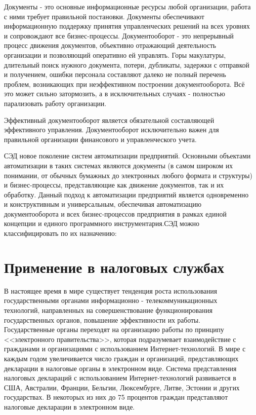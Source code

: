 \documentclass[14pt,a4paper]{reportmod}
\begin{document}
Документы - это основные информационные ресурсы любой организации, работа с ними требует правильной постановки. Документы обеспечивают информационную поддержку принятия управленческих решений на всех уровнях и сопровождают все бизнес-процессы. Документооборот - это непрерывный процесс движения документов, объективно отражающий деятельность организации и позволяющий оперативно ей управлять. Горы макулатуры, длительный поиск нужного документа, потери, дубликаты, задержки с отправкой и получением, ошибки персонала составляют далеко не полный перечень проблем, возникающих при неэффективном построении документооборота. Всё это может сильно затормозить, а в исключительных случаях - полностью парализовать работу организации\cite{refdoconline}.


Эффективный документооборот является обязательной составляющей эффективного управления. Документооборот исключительно важен для правильной организации финансового и управленческого учета.


СЭД новое поколение систем автоматизации предприятий. Основными объектами автоматизации в таких системах являются документы (в самом широком их понимании, от обычных бумажных до электронных любого формата и структуры) и бизнес-процессы, представляющие как движение документов, так и их обработку. Данный подход к автоматизации предприятий является одновременно и конструктивным и универсальным, обеспечивая автоматизацию документооборота и всех бизнес-процессов предприятия в рамках единой концепции и единого программного инструментария.СЭД можно классифицировать по их назначению:
\begin{gostitemize}
\end{gostitemize}

\section{Применение в налоговых службах}
В настоящее время в мире существует тенденция роста использования государственными органами информационно - телекоммуникационных технологий, направленных на совершенствование функционирования государственных органов, повышение эффективности их работы. Государственные органы переходят на организацию работы по принципу <<электронного правительства>>, которая подразумевает взаимодействие с гражданами и организациями с использованием Интернет-технологий. В мире с каждым годом увеличивается число граждан и организаций, представляющих декларации в налоговые органы в электронном виде. Система представления налоговых деклараций с использованием Интернет-технологий развивается в США, Австралии, Франции, Бельгии, Люксембурге, Литве, Эстонии и других государствах. В некоторых из них до 75 процентов граждан представляют налоговые декларации в электронном виде.
\end{document}
